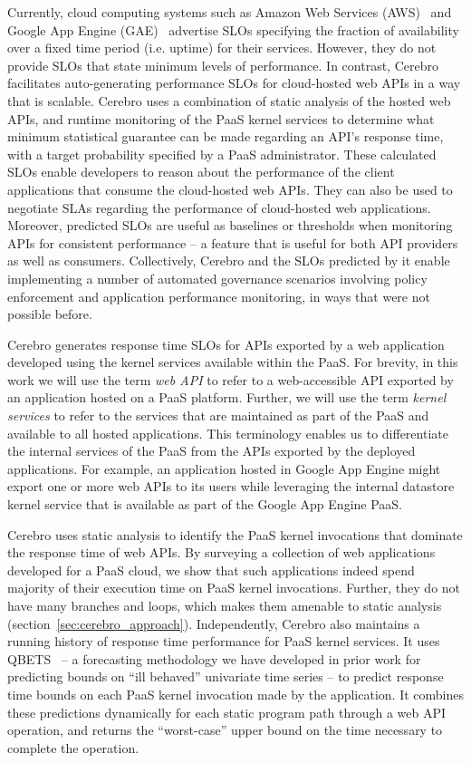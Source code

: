 Currently, cloud computing systems such as Amazon Web Services
(AWS)~\cite{amazon-aws-web} and
Google App Engine (GAE)~\cite{gae} advertise SLOs specifying the fraction of
availability over a fixed time period (i.e. uptime) for their services.
However, they do not provide SLOs
that state minimum levels of performance.
In contrast, Cerebro facilitates auto-generating performance SLOs for cloud-hosted
web APIs in a way that is scalable.
Cerebro uses a combination of static analysis of the hosted web APIs, 
and runtime monitoring of the PaaS kernel services
to determine what minimum statistical guarantee can be made regarding an
API's response time,
with a target probability specified by a PaaS administrator. These calculated
SLOs enable developers to
reason about the performance of the client applications that consume the cloud-hosted
web APIs. They can also be used to negotiate SLAs regarding the performance of
cloud-hosted web applications.
Moreover, predicted SLOs are useful as baselines or thresholds when monitoring APIs 
for consistent performance -- a feature that is useful for both API providers
as well as consumers. Collectively, Cerebro and the SLOs predicted by it 
enable implementing a number of automated governance scenarios involving
policy enforcement and application performance monitoring, in ways that
were not possible before.

Cerebro generates response time SLOs for APIs exported by a web
application
developed using the kernel services available within the PaaS.  For brevity, in this work
we will use the
term \textit{web API} to refer to a web-accessible API exported by an
application hosted on a PaaS platform. Further, 
we will use the term \textit{kernel services} to refer to the services that are 
maintained as part of the PaaS and
available to all hosted applications. This terminology enables us to
differentiate the internal services of the PaaS from the 
APIs exported by the deployed applications.   
For example, an application hosted in Google App Engine might export one or
more web APIs to its users while leveraging the internal 
datastore kernel service that is available as part of the Google App Engine PaaS.

Cerebro uses static analysis to identify the PaaS kernel invocations
that dominate the response time of web APIs. By surveying a collection of
web applications developed for a PaaS cloud, we show
that such applications indeed spend majority of their execution time on PaaS kernel
invocations. Further, they do not have many branches and loops, which
makes them amenable to static analysis (section~\ref{sec:cerebro_approach}). Independently,
Cerebro also maintains a running history of response time 
performance for PaaS kernel services.  It uses
QBETS~\cite{Nurmi:2007:QQB:1791551.1791556} -- a forecasting methodology
we have developed in prior work for predicting bounds on ``ill behaved''
univariate time series -- to predict response time bounds on each PaaS kernel
invocation made by the application.  It combines these predictions dynamically
for each static program path through a web API operation,
and returns the ``worst-case''
upper bound on the time necessary to 
complete the operation.

